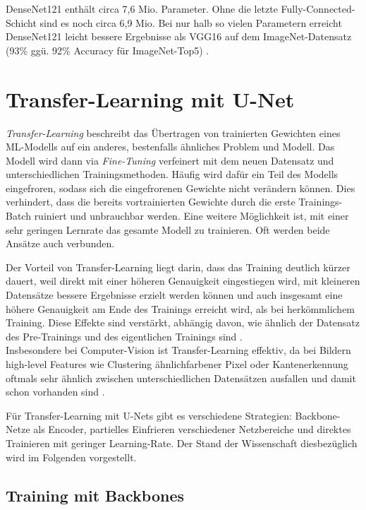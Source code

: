 DenseNet121 enthält circa 7,6 Mio. Parameter. Ohne die letzte Fully-Connected-Schicht sind es noch circa 6,9 Mio. 
Bei nur halb so vielen Parametern erreicht DenseNet121 leicht bessere Ergebnisse als VGG16 auf dem ImageNet-Datensatz 
(93\% ggü. 92\% Accuracy für ImageNet-Top5) \cite{Huang.25082016}. 


\section{Transfer-Learning mit U-Net} \label{sec:transfer-learning}

\textit{Transfer-Learning} beschreibt das Übertragen von trainierten Gewichten eines \ac{ML}-Modells auf ein anderes, 
bestenfalls ähnliches Problem und Modell. Das Modell wird dann via \textit{Fine-Tuning} verfeinert mit dem neuen Datensatz und unterschiedlichen Trainingsmethoden.
Häufig wird dafür ein Teil des Modells eingefroren, sodass sich die eingefrorenen Gewichte nicht verändern können. Dies verhindert, 
dass die bereits vortrainierten Gewichte durch die erste Trainings-Batch ruiniert und unbrauchbar werden. Eine weitere Möglichkeit ist,
mit einer sehr geringen Lernrate das gesamte Modell zu trainieren. Oft werden beide Ansätze auch verbunden.

Der Vorteil von Transfer-Learning liegt darin, dass das Training deutlich kürzer dauert, 
weil direkt mit einer höheren Genauigkeit eingestiegen wird, mit kleineren Datensätze bessere Ergebnisse erzielt werden können
 und auch insgesamt eine höhere Genauigkeit 
am Ende des Trainings erreicht wird, als bei herkömmlichem Training. Diese Effekte sind verstärkt, 
abhängig davon, wie ähnlich der Datensatz des Pre-Trainings und des eigentlichen Trainings sind \cite{Ruder.3212017}. \\
Insbesondere bei Computer-Vision ist Transfer-Learning effektiv, da bei Bildern high-level Features wie Clustering 
ähnlichfarbener Pixel oder Kantenerkennung oftmals sehr ähnlich zwischen unterschiedlichen Datensätzen ausfallen 
und damit schon vorhanden sind \cite{Ruder.3212017}. 

Für Transfer-Learning mit U-Nets gibt es verschiedene Strategien: Backbone-Netze als Encoder, 
partielles Einfrieren verschiedener Netzbereiche und direktes Trainieren mit geringer Learning-Rate.
Der Stand der Wissenschaft diesbezüglich wird im Folgenden vorgestellt. 

\subsection{Training mit Backbones}

